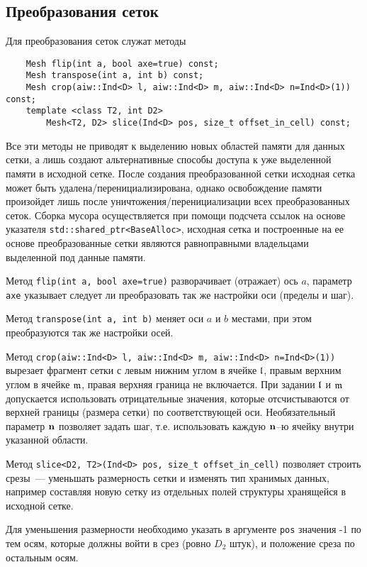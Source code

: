 \subsection{Преобразования сеток}\label{mesh:change:sec}
Для преобразования сеток служат методы
\begin{verbatim}
    Mesh flip(int a, bool axe=true) const;
    Mesh transpose(int a, int b) const;
    Mesh crop(aiw::Ind<D> l, aiw::Ind<D> m, aiw::Ind<D> n=Ind<D>(1)) const;
    template <class T2, int D2> 
        Mesh<T2, D2> slice(Ind<D> pos, size_t offset_in_cell) const;
\end{verbatim}
Все эти методы не приводят к выделению новых областей памяти для данных сетки, а лишь 
создают альтернативные способы доступа к уже выделенной памяти в исходной сетке. 
После создания преобразованной сетки исходная сетка может быть удалена/перенициализирована, однако 
освобождение памяти произойдет лишь после уничтожения/перенициализации всех преобразованных сеток. 
Сборка мусора осуществляется при помощи подсчета ссылок на основе указателя \verb'std::shared_ptr<BaseAlloc>',
исходная сетка и построенные на ее основе преобразованные сетки являются равноправными владельцами выделенной под 
данные памяти.

Метод  \verb'flip(int a, bool axe=true)' разворачивает (отражает) ось $a$, параметр \verb'axe' указывает следует ли 
преобразовать так же настройки оси (пределы и шаг).

Метод \verb'transpose(int a, int b)' меняет оси $a$ и $b$ местами, при этом преобразуются так же настройки осей.

Метод \verb'crop(aiw::Ind<D> l, aiw::Ind<D> m, aiw::Ind<D> n=Ind<D>(1))' вырезает фрагмент сетки
с левым нижним углом в ячейке $\mathfrak{l}$, правым верхним углом в ячейке $\mathfrak{m}$, правая верхняя граница не включается.
При задании $\mathfrak{l}$ и $\mathfrak{m}$ допускается использовать отрицательные значения, которые отсчистываются 
от верхней границы (размера сетки) по соответствующей оси. Необязательный параметр ${\bf n}$ позволяет задать шаг,
т.е. использовать каждую ${\bf n}$--ю ячейку внутри указанной области.

Метод \verb'slice<D2, T2>(Ind<D> pos, size_t offset_in_cell)' позволяет строить срезы~---
уменьшать размерность сетки и изменять тип хранимых данных,
например составляя новую сетку из отдельных полей структуры хранящейся в исходной сетке.

Для уменьшения  размерности необходимо указать в аргументе \verb'pos' значения -1 по тем осям, которые
должны войти в срез (ровно $D_2$ штук), и положение среза по остальным осям.

